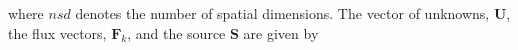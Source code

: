 \documentclass[times,11pt]{ACME2015article}
\newcommand{\mb}{\mathbf}
\begin{document}

where $nsd$ denotes the number of spatial dimensions. The vector of unknowns, $\mb{U}$, the flux vectors, $\mb{F}_k$, and the source $\mathbf{S}$ are given by
\end{document}
